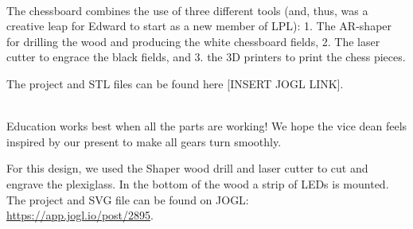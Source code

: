 \documentclass{report}
\begin{document}
 \\

The chessboard combines the use of three different tools (and, thus, was a creative leap for Edward to start as a new member of LPL): 1. The AR-shaper for drilling the wood and producing the white chessboard fields, 2. The laser cutter to engrace the black fields, and 3. the 3D printers to print the chess pieces.

The project and STL files can be found here [INSERT JOGL LINK].

\clearpage
\begin{figure}
    \centering
\end{figure}
\clearpage

 \\

Education works best when all the parts are working! We hope the vice dean feels inspired by our present to make all gears turn smoothly. 

For this design, we used the Shaper wood drill and laser cutter to cut and engrave the plexiglass. In the bottom of the wood a strip of LEDs is mounted.
The project and SVG file can be found on JOGL:\\
\url{https://app.jogl.io/post/2895}.
\end{document}
